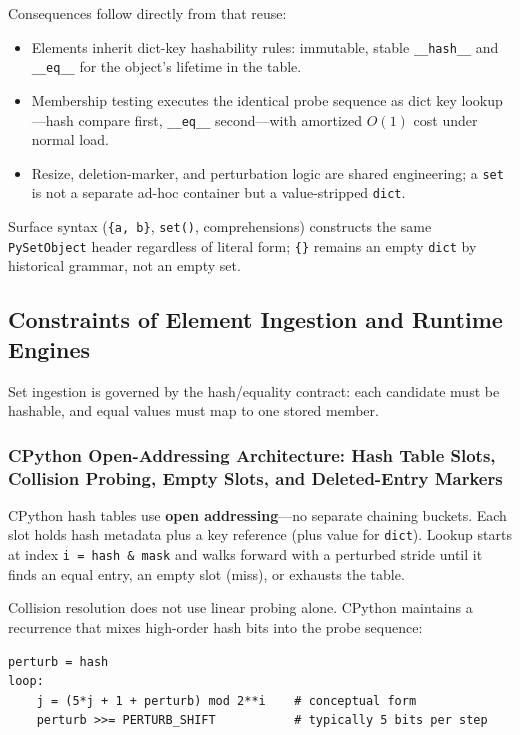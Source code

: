 \documentclass[a4paper,twoside]{report}
\begin{document}
Consequences follow directly from that reuse:

\begin{itemize}
    \item Elements inherit dict-key hashability rules: immutable, stable \texttt{\_\_hash\_\_} and \texttt{\_\_eq\_\_} for the object's lifetime in the table.
    \item Membership testing executes the identical probe sequence as dict key lookup---hash compare first, \texttt{\_\_eq\_\_} second---with amortized $O(1)$ cost under normal load.
    \item Resize, deletion-marker, and perturbation logic are shared engineering; a \texttt{set} is not a separate ad-hoc container but a value-stripped \texttt{dict}.
\end{itemize}

Surface syntax (\texttt{\{a, b\}}, \texttt{set()}, comprehensions) constructs the same \texttt{PySetObject} header regardless of literal form; \texttt{\{\}} remains an empty \texttt{dict} by historical grammar, not an empty set.


\subsection{Constraints of Element Ingestion and Runtime Engines}

Set ingestion is governed by the hash/equality contract: each candidate must be hashable, and equal values must map to one stored member.

\subsubsection{CPython Open-Addressing Architecture: Hash Table Slots, Collision Probing, Empty Slots, and Deleted-Entry Markers}

CPython hash tables use \textbf{open addressing}---no separate chaining buckets. Each slot holds hash metadata plus a key reference (plus value for \texttt{dict}). Lookup starts at index \texttt{i = hash \& mask} and walks forward with a perturbed stride until it finds an equal entry, an empty slot (miss), or exhausts the table.

Collision resolution does not use linear probing alone. CPython maintains a recurrence that mixes high-order hash bits into the probe sequence:

\begin{verbatim}
perturb = hash
loop:
    j = (5*j + 1 + perturb) mod 2**i    # conceptual form
    perturb >>= PERTURB_SHIFT           # typically 5 bits per step
\end{verbatim}
\end{document}
